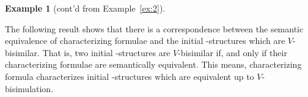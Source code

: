 \documentclass{article}
\newtheorem{example}{Example}
\begin{document}
\begin{example}[cont'd from Example~\ref{ex:2}]



\end{example}


The following result shows that there is a correspondence between the semantic equivalence of characterizing formulae and the initial \MPK-structures which are $V$-bisimilar. That is, two initial \MPK-structures are $V$-bisimilar if, and only if  their characterizing formulae are semantically equivalent. This means,  characterizing formula characterizes initial \MPK-structures which are equivalent up to $V$-bisimulation.

\end{document}
